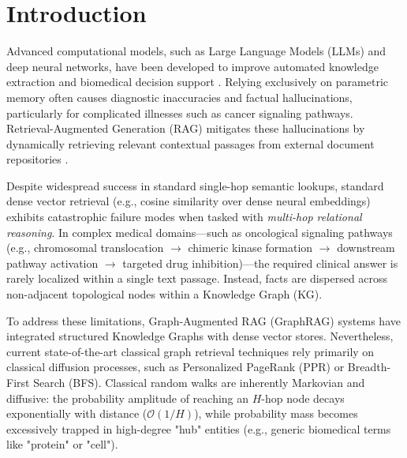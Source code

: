 \documentclass[sn-basic,Numbered]{sn-jnl}
\begin{document}

\maketitle

\section{Introduction}\label{sec1}
Advanced computational models, such as Large Language Models (LLMs) and deep neural networks, have been developed to improve automated knowledge extraction and biomedical decision support \cite{lewis2020retrieval}. Relying exclusively on parametric memory often causes diagnostic inaccuracies and factual hallucinations, particularly for complicated illnesses such as cancer signaling pathways. Retrieval-Augmented Generation (RAG) mitigates these hallucinations by dynamically retrieving relevant contextual passages from external document repositories \cite{edge2024graphrag}.

Despite widespread success in standard single-hop semantic lookups, standard dense vector retrieval (e.g., cosine similarity over dense neural embeddings) exhibits catastrophic failure modes when tasked with \textit{multi-hop relational reasoning}. In complex medical domains---such as oncological signaling pathways (e.g., chromosomal translocation $\rightarrow$ chimeric kinase formation $\rightarrow$ downstream pathway activation $\rightarrow$ targeted drug inhibition)---the required clinical answer is rarely localized within a single text passage. Instead, facts are dispersed across non-adjacent topological nodes within a Knowledge Graph (KG).

To address these limitations, Graph-Augmented RAG (GraphRAG) systems have integrated structured Knowledge Graphs with dense vector stores. Nevertheless, current state-of-the-art classical graph retrieval techniques rely primarily on classical diffusion processes, such as Personalized PageRank (PPR) or Breadth-First Search (BFS). Classical random walks are inherently Markovian and diffusive: the probability amplitude of reaching an $H$-hop node decays exponentially with distance ($\mathcal{O}(1/H)$), while probability mass becomes excessively trapped in high-degree "hub" entities (e.g., generic biomedical terms like "protein" or "cell").
\end{document}
